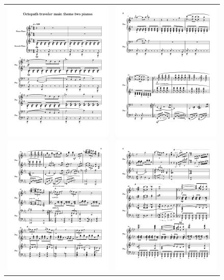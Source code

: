 \documentclass[12pt]{article}
\begin{document}
\begin{figure}[H]
\centering
\begin{tabular}{cc}
\includegraphics[width=.4\linewidth, trim=30 100 30 20, clip]{octopathscore/octopathscore1024_1.png} &
\includegraphics[width=0.4\linewidth, trim=30 100 30 20, clip]{octopathscore/octopathscore1024_2.png} \\
\includegraphics[width=0.4\linewidth, trim=30 100 30 20, clip]{octopathscore/octopathscore1024_3.png} &
\includegraphics[width=0.4\linewidth, trim=30 100 30 20, clip]{octopathscore/octopathscore1024_4.png}

\end{tabular}
\end{figure}
\end{document}
